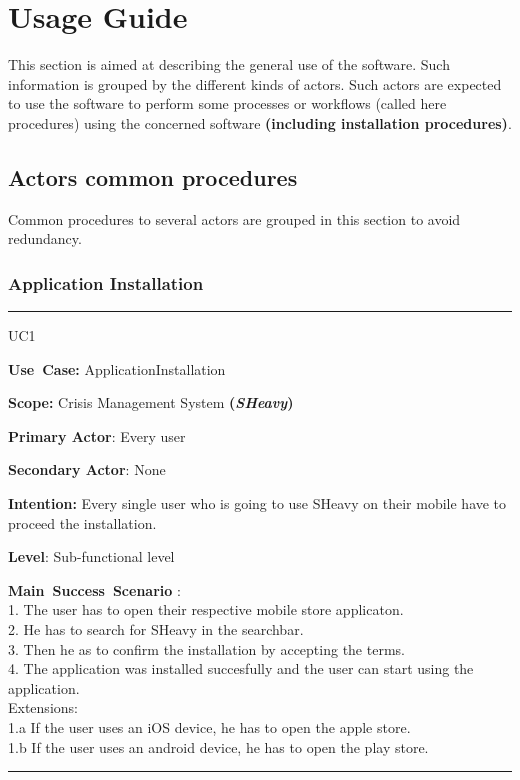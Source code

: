 \chapter{Usage Guide}
\label{chap:usage_guide}

This section is aimed at describing the general use of the software. Such
information is grouped by the different kinds of actors.
Such actors are expected to use the software to perform some
processes or workflows (called here procedures) using the concerned software
\textbf{(including installation procedures)}.

\section{Actors common procedures}
Common procedures to several actors are grouped in this section to avoid
redundancy.

\subsection{Application Installation}
\vspace{0.5cm}
\hrule
\vspace{0.5cm}
\begin{lyxlist}{UC1}
\small{
\item [\textbf{Use~Case:}] ApplicationInstallation
\item [\textbf{Scope:}] Crisis Management System \textbf{(\emph{SHeavy})}
\item [\textbf{Primary Actor}:] Every user
\item [\textbf{Secondary Actor}:] None
\item [\textbf{Intention:}] Every single user who is going to use SHeavy on
their mobile have to proceed the installation.
\item [\textbf{Level}:]Sub-functional level
\item [\textbf{Main~Success~Scenario}]:\\
1. The user has to open their respective mobile store applicaton.\\
2. He has to search for SHeavy in the searchbar.\\
3. Then he as to confirm the installation by accepting the terms.\\
4. The application was installed succesfully and the user can start using the
application.\\
Extensions:\\
1.a If the user uses an iOS device, he has to open the apple store.\\
1.b If the user uses an android device, he has to open the play store.\\	
}
\end{lyxlist}
\hrule 
\vspace{0.5cm}

